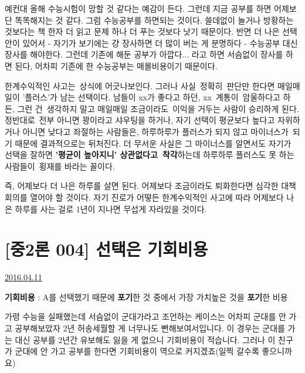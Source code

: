 예컨대 올해 수능시험이 망할 것 같다는 예감이 든다. 그런데 지금 공부를 하면 어제보단 똑똑해지는 것 같다.
그럼 수능공부를 하면되는 것이다. 쓸데없이 놀거나 방황하는 것보다는 책 한자 더 읽고 문제 하나 더 푸는 것보다 낫기 때문이다.
반면 더 나은 선택안이 있어서 - 자기가 보기에는 걍 장사하면 더 많이 버는 게 분명하다 - 수능공부 대신 장사를 해야한다.
그런데 기존에 해둔 공부가 아깝다... 라고 하면 서슴없이 장사를 하면 된다, 어차피 기존에 한 수능공부는 매몰비용이기 때문이다.
\vspace{5mm}

한계수익적인 사고는 상식에 어긋나보인다. 그러나 사실 정확히 판단만 한다면 매일매일이 '플러스'가 남는 선택이다.
남들이 xx가 좋다고 하던, xx 계통이 암울하다고 하든, 그런 건 생각하지 말고 매일매일 조금이라도 이익을 거두는 사람이 승리하게 된다.
정반대로 전부 아니면 꽝이라고 샤우팅을 하거나, 자기 선택이 평균보다 높다고 자위하거나 아니면 낮다고 좌절하는 사람들은,
하루하루가 플러스가 되지 않고 마이너스가 되기 때문에 결과적으로는 뒤처진다.
더 무서운 사실은 그 마이너스를 알면서도 자기가 선택을 잘하면 \textbf{'평균이 높아지니' 상관없다고 착각}하는데
하루하루 플러스도 못 하는 사람들이 횡재를 바라는 꼴이다.
\vspace{5mm}

즉, 어제보다 더 나은 하루를 살면 된다.
어제보다 조금이라도 퇴화한다면 심각한 대책회의를 열어야 할 것이다.
자기 진로가 어떻든 한계수익적인 사고에 따라 어제보다 나은 하루를 사는 걸로 1년이 지나면 무섭게 자라있을 것이다.
\vspace{5mm}







\section{[중2론 004] 선택은 기회비용}
\href{https://www.kockoc.com/Apoc/724006}{2016.04.11}

\vspace{5mm}

\textbf{기회비용} : A를 선택했기 때문에 \textbf{포기}한 것 중에서 가장 가치높은 것을 \textbf{포기}한 비용
\vspace{5mm}

가령 수능을 실패했는데 서슴없이 군대가라고 조언하는 케이스는
어차피 군대를 안 가고 공부해보았자 2년 허송세월할 게 너무나도 뻔해보여서입니다.
이 경우는 군대를 가는 대신 공부를 2년간 유보해도 잃을 게 없으니 기회비용이 적습니다.
그러나 이 친구가 군대에 안 가고 공부를 한다면 기회비용이 역으로 커지겠죠(일찍 갈수록 좋으니까요)
\vspace{5mm}

